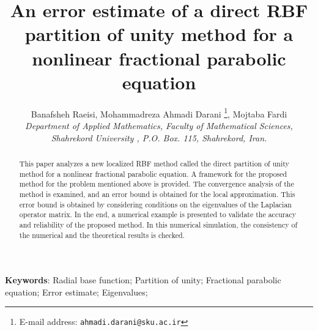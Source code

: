 \documentclass[9pt]{article}
\title{An error estimate of a direct RBF partition of unity method  for a nonlinear fractional parabolic equation}
\author{Banafsheh  Raeisi, Mohammadreza Ahmadi Darani \normalsize{
          \thanks{E-mail address: \texttt{ahmadi.darani@sku.ac.ir}},   Mojtaba Fardi}\\
          \footnotesize{
                        \em Department  of  Applied Mathematics, Faculty  of  Mathematical Sciences,
                       }\\
                       \footnotesize{
                        \em  Shahrekord University , P.O. Box. 115,
                        Shahrekord, Iran.
                       }
        }
\date{}
\numberwithin{equation}{section}
\begin{document}
\maketitle
\begin{abstract}
This paper analyzes a new localized RBF method called the direct partition of unity method for a nonlinear fractional parabolic equation. A framework for the proposed method for the problem mentioned above is provided. The convergence analysis of the method is examined, and an error bound is obtained for the local approximation. This error bound is obtained by considering conditions on the eigenvalues of the Laplacian operator matrix. In the end, a numerical example is presented to validate the accuracy and reliability of the proposed method. In this numerical simulation, the consistency of the numerical and the theoretical results is checked.
\end{abstract}
\hskip0.5cm \textbf{Keywords}: Radial base function; Partition of unity; Fractional parabolic equation; Error estimate; Eigenvalues; 
\end{document}
